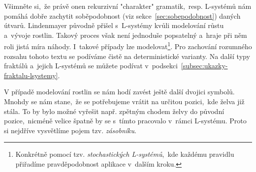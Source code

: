 Všimněte si,~že právě onen rekurzivní "charakter" gramatik,~resp. L-systémů nám pomáhá dobře zachytit soběpodobnost (viz sekce~\ref{sec:sobepodobnost}) daných útvarů. Lindenmayer původně přišel s~L-systémy kvůli modelování růstu a~vývoje rostlin. Takový proces však není jednoduše popsatelný a~hraje při něm roli jistá míra náhody. \cite{Prusinkiewicz1990} I~takové případy lze modelovat\footnote{Konkrétně pomocí tzv. \emph{stochastických L-systémů},~kde každému pravidlu přiřadíme pravděpodobnost aplikace v~dalším kroku.}. Pro zachování rozumného rozsahu tohoto textu se podíváme čistě na deterministické varianty. Na další typy fraktálů a~jejich L-systémů se můžete podívat v~podsekci~\ref{subsec:ukazky-fraktalu-lsystemy}.

V případě modelování rostlin se nám hodí zavést ještě další dvojici symbolů. Mnohdy se nám stane,~že se potřebujeme vrátit na určitou pozici,~kde želva již stála. To by bylo možné vyřešit např. zpětným chodem želvy do původní pozice,~nicméně velice špatně by se s~tímto pracovalo v~rámci L-systému. Proto si nejdříve vysvětlíme pojem tzv. \emph{zásobníku}.

